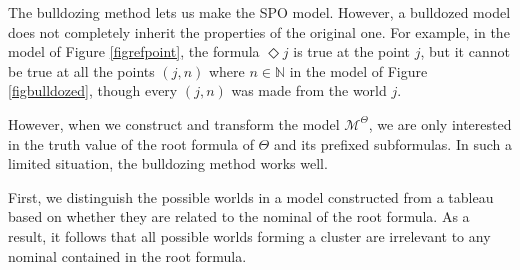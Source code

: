 \documentclass{article}
\theoremstyle{definition}
\newcommand{\Dia}{\Diamond}
\newcommand{\Kmodel}{\mathcal{M}}
\begin{document}
The bulldozing method lets us make the SPO model. However, a bulldozed model does not completely inherit the properties of the original one. For example, in the model of Figure \ref{figrefpoint}, the formula $\Dia j$ is true at the point $j$, but it cannot be true at all the points $(j, n)$ where $n \in \mathbb{N}$ in the model of Figure \ref{figbulldozed}, though every $(j, n)$ was made from the world $j$. 

However, when we construct and transform the model $\Kmodel^\Theta$, we are only interested in the truth value of the root formula of $\Theta$ and its prefixed subformulas. In such a limited situation, the bulldozing method works well.

First, we distinguish the possible worlds in a model constructed from a tableau based on whether they are related to the nominal of the root formula. As a result, it follows that all possible worlds forming a cluster are irrelevant to any nominal contained in the root formula.
\end{document}
